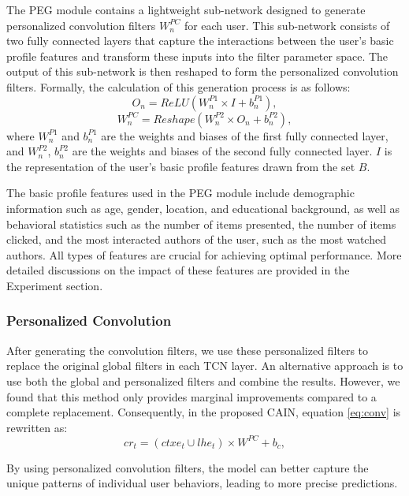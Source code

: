 The PEG module contains a lightweight sub-network designed to generate personalized convolution filters $W^{PC}_n$ for each user. This sub-network consists of two fully connected layers that capture the interactions between the user's basic profile features and transform these inputs into the filter parameter space. The output of this sub-network is then reshaped to form the personalized convolution filters. Formally, the calculation of this generation process is as follows: 
\begin{equation}
    O_n=ReLU(W^{P1}_n \times I + b^{P1}_n),
\label{eq:peg1}
\end{equation}
\begin{equation}
    W^{PC}_n=Reshape(W^{P2}_n \times O_n + b^{P2}_n),
\label{eq:peg2}
\end{equation}
where $W^{P1}_n$ and $b^{P1}_n$ are the weights and biases of the first fully connected layer, and $W^{P2}_n$, $b^{P2}_n$ are the weights and biases of the second fully connected layer. $I$ is the representation of the user's basic profile features drawn from the set {$B$}. 

The basic profile features used in the PEG module include demographic information such as age, gender, location, and educational background, as well as behavioral statistics such as the number of items presented, the number of items clicked, and the most interacted authors of the user, such as the most watched authors. All types of features are crucial for achieving optimal performance. More detailed discussions on the impact of these features are provided in the Experiment section. 

\subsubsection{Personalized Convolution}

After generating the convolution filters, we use these personalized filters to replace the original global filters in each TCN layer. An alternative approach is to use both the global and personalized filters and combine the results. However, we found that this method only provides marginal improvements compared to a complete replacement. Consequently, in the proposed CAIN, equation \ref{eq:conv} is rewritten as: 
\begin{equation} 
    cr_t = (ctxe_t \cup lhe_t) \times W^{PC} + b_c,
\label{eq:pconv}
\end{equation}

By using personalized convolution filters, the model can better capture the unique patterns of individual user behaviors, leading to more precise predictions. 
